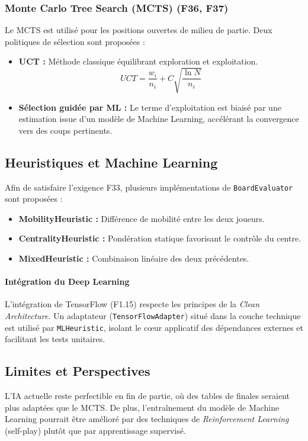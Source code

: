 \documentclass[9pt]{extarticle} %
\begin{document}
\subsubsection{Monte Carlo Tree Search (MCTS) (F36, F37)}
Le MCTS est utilisé pour les positions ouvertes de milieu de partie. Deux politiques de sélection sont proposées :
\begin{itemize}
    \item \textbf{UCT :} Méthode classique équilibrant exploration et exploitation.
    \[
    UCT = \frac{w_i}{n_i} + C \sqrt{\frac{\ln N}{n_i}}
    \]
    \item \textbf{Sélection guidée par ML :} Le terme d’exploitation est biaisé par une estimation issue d’un modèle de Machine Learning, accélérant la convergence vers des coups pertinents.
\end{itemize}

\subsection{Heuristiques et Machine Learning}

Afin de satisfaire l’exigence F33, plusieurs implémentations de \texttt{BoardEvaluator} sont proposées :
\begin{itemize}
    \item \textbf{MobilityHeuristic :} Différence de mobilité entre les deux joueurs.
    \item \textbf{CentralityHeuristic :} Pondération statique favorisant le contrôle du centre.
    \item \textbf{MixedHeuristic :} Combinaison linéaire des deux précédentes.
\end{itemize}

\paragraph{Intégration du Deep Learning}
L’intégration de TensorFlow (F1.15) respecte les principes de la \textit{Clean Architecture}.  
Un adaptateur (\texttt{TensorFlowAdapter}) situé dans la couche technique est utilisé par \texttt{MLHeuristic}, isolant le cœur applicatif des dépendances externes et facilitant les tests unitaires.

\subsection{Limites et Perspectives}

L’IA actuelle reste perfectible en fin de partie, où des tables de finales seraient plus adaptées que le MCTS.  
De plus, l’entraînement du modèle de Machine Learning pourrait être amélioré par des techniques de \textit{Reinforcement Learning} (self-play) plutôt que par apprentissage supervisé.
\end{document}
